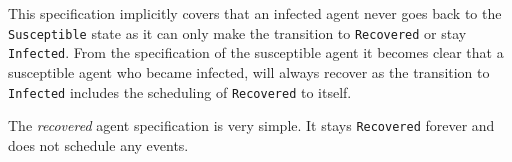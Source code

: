 This specification implicitly covers that an infected agent never goes back to the \texttt{Susceptible} state as it can only make the transition to \texttt{Recovered} or stay \texttt{Infected}. From the specification of the susceptible agent it becomes clear that a susceptible agent who became infected, will always recover as the transition to \texttt{Infected} includes the scheduling of \texttt{Recovered} to itself. 

\medskip

The \textit{recovered} agent specification is very simple. It stays \texttt{Recovered} forever and does not schedule any events.